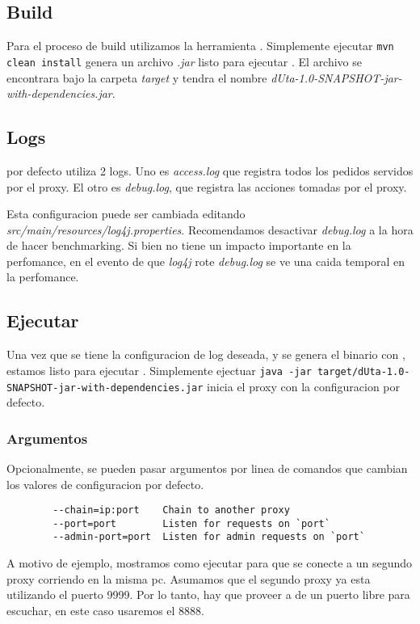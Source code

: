 \documentclass[11pt,a4paper,titlepage]{article}
\begin{document}
    \subsection{Build}
    Para el proceso de build utilizamos la herramienta .
    Simplemente ejecutar \texttt{mvn clean install} genera un archivo \textit{.jar} listo para ejecutar \duta.
    El archivo se encontrara bajo la carpeta \textit{target} y tendra el nombre \textit{dUta-1.0-SNAPSHOT-jar-with-dependencies.jar}.

    \subsection{Logs}
    \duta por defecto utiliza 2 logs.
    Uno es \textit{access.log} que registra todos los pedidos servidos por el proxy.
    El otro es \textit{debug.log}, que registra las acciones tomadas por el proxy.

    Esta configuracion puede ser cambiada editando \textit{src/main/resources/log4j.properties}.
    Recomendamos desactivar \textit{debug.log} a la hora de hacer benchmarking.
    Si bien no tiene un impacto importante en la perfomance, en el evento de que \textit{log4j} rote \textit{debug.log} se ve una caida temporal en la perfomance.

    \subsection{Ejecutar \duta}
    Una vez que se tiene la configuracion de log deseada, y se genera el binario con , estamos listo para ejecutar \duta.
    Simplemente ejectuar \texttt{java -jar target/dUta-1.0-SNAPSHOT-jar-with-dependencies.jar} inicia el proxy con la configuracion por defecto.

    \subsubsection{Argumentos}
    Opcionalmente, se pueden pasar argumentos por linea de comandos que cambian los valores de configuracion por defecto.
    \begin{verbatim}
        --chain=ip:port    Chain to another proxy
        --port=port        Listen for requests on `port`
        --admin-port=port  Listen for admin requests on `port`
    \end{verbatim}

    A motivo de ejemplo, mostramos como ejecutar \duta para que se conecte a un segundo proxy corriendo en la misma pc.
    Asumamos que el segundo proxy ya esta utilizando el puerto 9999.
    Por lo tanto, hay que proveer a \duta de un puerto libre para escuchar, en este caso usaremos el 8888.
\end{document}
